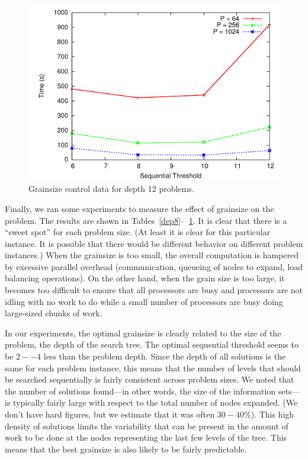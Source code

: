 \documentclass[times, 10pt,twocolumn]{article}
\begin{document}
\begin{figure}[h]
\centering
\includegraphics[width=0.6\columnwidth]{plots/dep12.pdf}
\caption{Grainsize control data for depth 12 problems.}
\label{dep12}
\end{figure}

Finally, we ran some experiments to measure the effect of grainsize on the problem.  The results are shown in
Tables~\ref{dep8}--~\ref{dep12}.  It is clear that there is a ``sweet spot'' for each problem size.  (At least it is
clear for this particular instance.  It is possible that there would be different behavior on different problem
instances.)  When the grainsize is too small, the overall computation is hampered by excessive parallel overhead
(communication, queueing of nodes to expand, load balancing operations).  On the other hand, when the grain size is too
large, it becomes too difficult to ensure that all processors are busy and processors are not idling with no work to do
while a small number of processors are busy doing large-sized chunks of work.  

In our experiments, the optimal grainsize is clearly related to the size of the problem, the depth of the search tree.
The optimal sequential threshold seems to be $2--4$ less than the problem depth.  Since the depth of all solutions is
the same for each problem instance, this means that the number of levels that should be searched sequentially is fairly
consistent across problem sizes.  We noted that the number of solutions found---in other words, the size of the
information sets---is typically fairly large with respect to the total number of nodes expanded.  (We don't have hard
figures, but we estimate that it was often $30-40\%$).  This high density of solutions limits the variability that can
be present in the amount of work to be done at the nodes representing the last few levels of the tree.  This means that
the best grainsize is also likely to be fairly predictable.  
\end{document}
